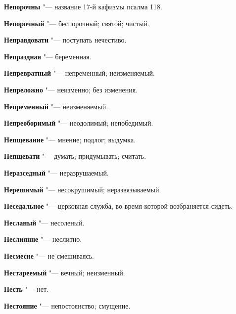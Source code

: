 \begin{mymulticols}{2}
\noindent\textbf{Непорочны} "--- название 17-й кафизмы псалма 118. 




\noindent\textbf{Непорочный} "--- беспорочный; святой; чистый. 




\noindent\textbf{Неправдовати} "--- поступать нечестиво. 




\noindent\textbf{Непраздная} "--- беременная. 




\noindent\textbf{Непревратный} "--- непременный; неизменяемый. 




\noindent\textbf{Непреложно} "--- неизменно; без изменения. 




\noindent\textbf{Непременный} "--- неизменяемый. 




\noindent\textbf{Непреоборимый} "--- неодолимый; непобедимый. 




\noindent\textbf{Непщевание} "--- мнение; подлог; выдумка. 




\noindent\textbf{Непщевати} "--- думать; придумывать; считать. 




\noindent\textbf{Неразседный} "--- неразрушаемый. 




\noindent\textbf{Нерешимый} "--- несокрушимый; неразвязываемый. 




\noindent\textbf{Неседальное} "--- церковная служба, во время которой возбраняется сидеть. 




\noindent\textbf{Несланый} "--- несоленый. 




\noindent\textbf{Неслиянне} "--- неслитно. 




\noindent\textbf{Несмесне} "--- не смешиваясь. 




\noindent\textbf{Нестареемый} "--- вечный; неизменный. 




\noindent\textbf{Несть} "--- нет. 




\noindent\textbf{Нестояние} "--- непостоянство; смущение. 





\end{mymulticols}
